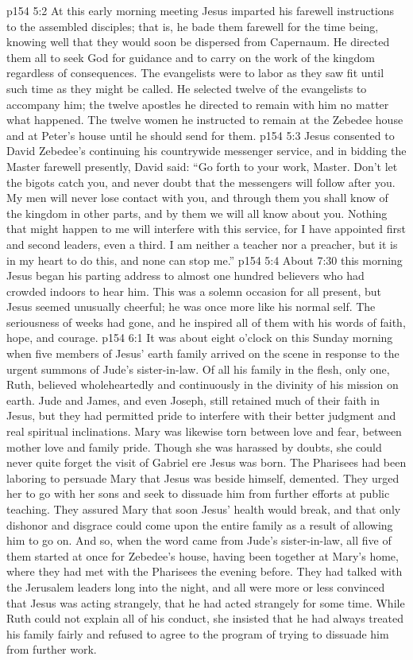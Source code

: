 \vs p154 5:2 At this early morning meeting Jesus imparted his farewell instructions to the assembled disciples; that is, he bade them farewell for the time being, knowing well that they would soon be dispersed from Capernaum. He directed them all to seek God for guidance and to carry on the work of the kingdom regardless of consequences. The evangelists were to labor as they saw fit until such time as they might be called. He selected twelve of the evangelists to accompany him; the twelve apostles he directed to remain with him no matter what happened. The twelve women he instructed to remain at the Zebedee house and at Peter’s house until he should send for them.
\vs p154 5:3 Jesus consented to David Zebedee’s continuing his countrywide messenger service, and in bidding the Master farewell presently, David said: “Go forth to your work, Master. Don’t let the bigots catch you, and never doubt that the messengers will follow after you. My men will never lose contact with you, and through them you shall know of the kingdom in other parts, and by them we will all know about you. Nothing that might happen to me will interfere with this service, for I have appointed first and second leaders, even a third. I am neither a teacher nor a preacher, but it is in my heart to do this, and none can stop me.”
\vs p154 5:4 About 7:30 this morning Jesus began his parting address to almost one hundred believers who had crowded indoors to hear him. This was a solemn occasion for all present, but Jesus seemed unusually cheerful; he was once more like his normal self. The seriousness of weeks had gone, and he inspired all of them with his words of faith, hope, and courage.\plusone
{}
\vs p154 6:1 It was about eight o’clock on this Sunday morning when five members of Jesus’ earth family arrived on the scene in response to the urgent summons of Jude’s sister\hyp{}in\hyp{}law. Of all his family in the flesh, only one, Ruth, believed wholeheartedly and continuously in the divinity of his mission on earth. Jude and James, and even Joseph, still retained much of their faith in Jesus, but they had permitted pride to interfere with their better judgment and real spiritual inclinations. Mary was likewise torn between love and fear, between mother love and family pride. Though she was harassed by doubts, she could never quite forget the visit of Gabriel ere Jesus was born. The Pharisees had been laboring to persuade Mary that Jesus was beside himself, demented. They urged her to go with her sons and seek to dissuade him from further efforts at public teaching. They assured Mary that soon Jesus’ health would break, and that only dishonor and disgrace could come upon the entire family as a result of allowing him to go on. And so, when the word came from Jude’s sister\hyp{}in\hyp{}law, all five of them started at once for Zebedee’s house, having been together at Mary’s home, where they had met with the Pharisees the evening before. They had talked with the Jerusalem leaders long into the night, and all were more or less convinced that Jesus was acting strangely, that he had acted strangely for some time. While Ruth could not explain all of his conduct, she insisted that he had always treated his family fairly and refused to agree to the program of trying to dissuade him from further work.
